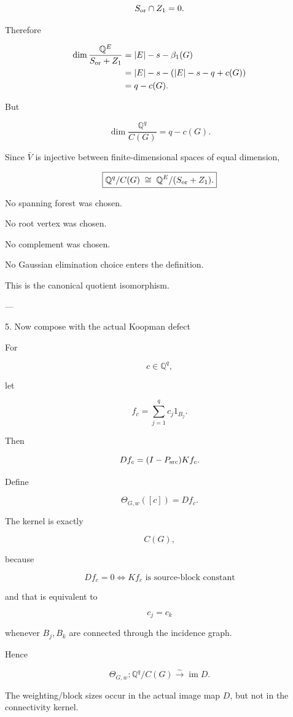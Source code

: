 \[
S_{\rm or}\cap Z_1=0.
\]

Therefore

\[
\begin{aligned}
\dim\frac{\mathbb Q^E}{S_{\rm or}+Z_1}
&=
|E|-s-\beta_1(G)\\
&=
|E|-s-
(|E|-s-q+c(G))\\
&=
q-c(G).
\end{aligned}
\]

But

\[
\dim\frac{\mathbb Q^q}{C(G)}
=
q-c(G).
\]

Since \(\bar V\) is injective between finite-dimensional spaces of equal dimension,

\[
\boxed{
\mathbb Q^q/C(G)
\;\cong\;
\mathbb Q^E/(S_{\rm or}+Z_1).
}
\]

No spanning forest was chosen.

No root vertex was chosen.

No complement was chosen.

No Gaussian elimination choice enters the definition.

This is the canonical quotient isomorphism.


---

5. Now compose with the actual Koopman defect

For

\[
c\in\mathbb Q^q,
\]

let

\[
f_c=\sum_{j=1}^q c_j1_{B_j}.
\]

Then

\[
D f_c
=
(I-P_{\rm src})Kf_c.
\]

Define

\[
\Theta_{G,w}([c])
=
Df_c.
\]

The kernel is exactly

\[
C(G),
\]

because

\[
Df_c=0
\iff
Kf_c
\text{ is source-block constant}
\]

and that is equivalent to

\[
c_j=c_k
\]

whenever \(B_j,B_k\) are connected through the incidence graph.

Hence

\[
\boxed{
\Theta_{G,w}:
\mathbb Q^q/C(G)
\stackrel{\sim}{\longrightarrow}
\operatorname{im}D.
}
\]

The weighting/block sizes occur in the actual image map \(D\), but not in the connectivity kernel.

